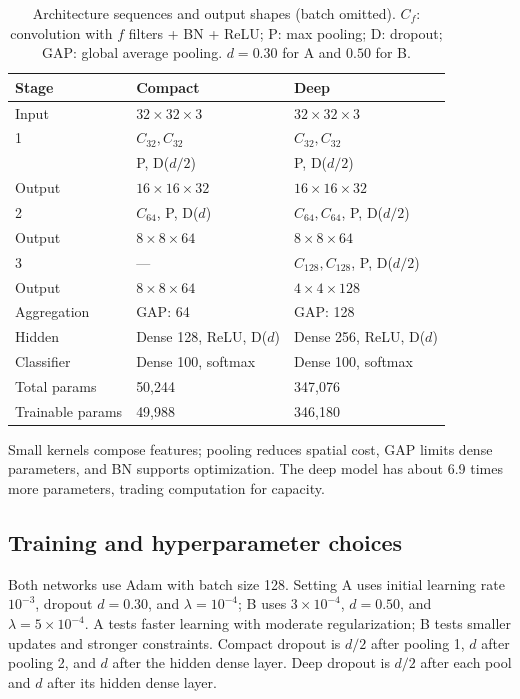 \documentclass[conference]{IEEEtran}
\begin{document}
\begin{table}[!ht]
\caption{Architecture sequences and output shapes (batch omitted). $C_f$: convolution with $f$ filters + BN + ReLU; P: max pooling; D: dropout; GAP: global average pooling. $d=0.30$ for A and $0.50$ for B.}
\label{tab:architecture}
\centering\footnotesize
\setlength{\tabcolsep}{3pt}
\begin{tabular}{@{}lll@{}}
\toprule
Stage & Compact & Deep\\
\midrule
Input & $32\times32\times3$ & $32\times32\times3$\\
1 & $C_{32}, C_{32}$ & $C_{32}, C_{32}$\\
 & P, D($d/2$) & P, D($d/2$)\\
Output & $16\times16\times32$ & $16\times16\times32$\\
2 & $C_{64}$, P, D($d$) & $C_{64}, C_{64}$, P, D($d/2$)\\
Output & $8\times8\times64$ & $8\times8\times64$\\
3 & --- & $C_{128}, C_{128}$, P, D($d/2$)\\
Output & $8\times8\times64$ & $4\times4\times128$\\
Aggregation & GAP: 64 & GAP: 128\\
Hidden & Dense 128, ReLU, D($d$) & Dense 256, ReLU, D($d$)\\
Classifier & Dense 100, softmax & Dense 100, softmax\\
Total params & 50,244 & 347,076\\
Trainable params & 49,988 & 346,180\\
\bottomrule
\end{tabular}
\end{table}

Small kernels compose features; pooling reduces spatial cost, GAP limits dense parameters, and BN supports optimization. The deep model has about 6.9 times more parameters, trading computation for capacity.

\subsection{Training and hyperparameter choices}
Both networks use Adam with batch size 128. Setting A uses initial learning rate $10^{-3}$, dropout $d=0.30$, and $\lambda=10^{-4}$; B uses $3\times10^{-4}$, $d=0.50$, and $\lambda=5\times10^{-4}$. A tests faster learning with moderate regularization; B tests smaller updates and stronger constraints. Compact dropout is $d/2$ after pooling 1, $d$ after pooling 2, and $d$ after the hidden dense layer. Deep dropout is $d/2$ after each pool and $d$ after its hidden dense layer.
\end{document}
